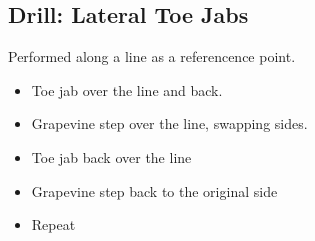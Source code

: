 \subsection*{Drill: Lateral Toe Jabs}
\label{drill:footwork/lateral_toe_jabs}


Performed along a line as a referencence point.

\begin{itemize}
\item Toe jab over the line and back.
\item Grapevine step over the line, swapping sides. 
\item Toe jab back over the line
\item Grapevine step back to the original side
\item Repeat
\end{itemize}



